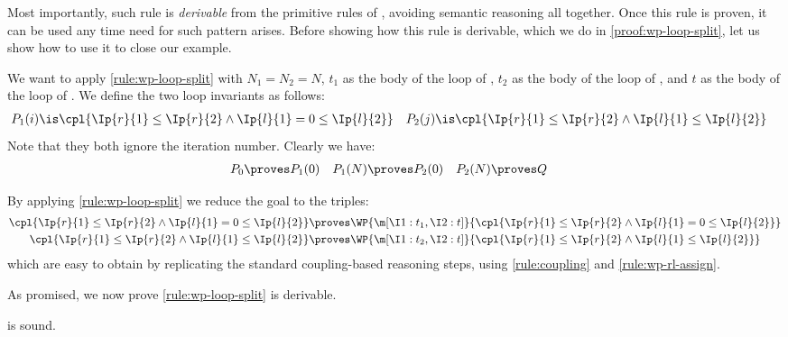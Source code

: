 Most importantly, such rule is \emph{derivable} from the primitive rules of \thelogic, avoiding semantic reasoning all together.
Once this rule is proven, it can be used any time need for such pattern arises.
Before showing how this rule is derivable,
which we do in \cref{proof:wp-loop-split},
let us show how to use it to close our example.

We want to apply \ref{rule:wp-loop-split} with $N_1=N_2=N$,
$t_1$ as the body of the loop of ,
$t_2$ as the body of the loop of ,
and
$t$ as the body of the loop of .
We define the two loop invariants as follows:
\begin{align*}
  P_1(i) &\is
    \cpl{
      \Ip{r}{1}\leq\Ip{r}{2}
      \land
      \Ip{l}{1}=0\leq\Ip{l}{2}
    }
  &
  P_2(j) &\is
    \cpl{
      \Ip{r}{1}\leq\Ip{r}{2}
      \land
      \Ip{l}{1}\leq\Ip{l}{2}
    }
\end{align*}
Note that they both ignore the iteration number.
Clearly we have:
\begin{align*}
  P_0 &\proves P_1(0)
  &
  P_1(N) &\proves P_2(0)
  &
  P_2(N) &\proves Q
\end{align*}

By applying \ref{rule:wp-loop-split} we reduce the goal to the triples:
\begin{align*}
  \cpl{
    \Ip{r}{1}\leq\Ip{r}{2}
    \land
    \Ip{l}{1}=0\leq\Ip{l}{2}
  }
  &\proves
  \WP{\m[
    \I1: t_1,
    \I2: t
  ]}{
    \cpl{
      \Ip{r}{1}\leq\Ip{r}{2}
      \land
      \Ip{l}{1}=0\leq\Ip{l}{2}
    }
  }
  \\
  \cpl{
    \Ip{r}{1}\leq\Ip{r}{2}
    \land
    \Ip{l}{1}\leq\Ip{l}{2}
  }
  &\proves
  \WP{\m[
    \I1: t_2,
    \I2: t
  ]}{
    \cpl{
      \Ip{r}{1}\leq\Ip{r}{2}
      \land
      \Ip{l}{1}\leq\Ip{l}{2}
    }
  }
\end{align*}
which are easy to obtain by replicating the standard coupling-based reasoning
steps, using \ref{rule:coupling} and \ref{rule:wp-rl-assign}.

\medskip
As promised, we now prove \ref{rule:wp-loop-split} is derivable.
\begin{lemma}
\label{proof:wp-loop-split}
   is sound.
\end{lemma}

